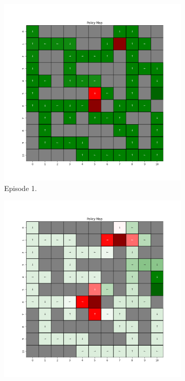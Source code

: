 \documentclass{assignment}
\begin{document}
\begin{figure}[H]
    \begin{subfigure}{0.3\textwidth}
        \includegraphics[width=\textwidth]{figures/policy_td/gamma_sweep/policy_alpha_0.1_gamma_0.75_epsilon_0.2_iteration_1.png}
    \caption{Episode 1.}
    \end{subfigure}\hfill
    \begin{subfigure}{0.3\textwidth}
        \includegraphics[width=\textwidth]{figures/policy_td/gamma_sweep/policy_alpha_0.1_gamma_0.75_epsilon_0.2_iteration_50.png}

\end{subfigure}
\end{figure}
\end{document}
